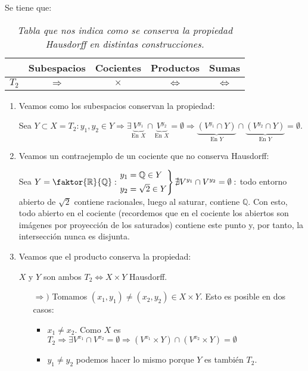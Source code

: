 Se tiene que:
\begin{table}[H]
\centering
\begin{tabular}{| c | c | c | c | c |}
    \hline
    & Subespacios & Cocientes & Productos & Sumas\\
    \hline
    $T_2$ & $\Rightarrow$ & $\times$ & $\Leftrightarrow$ & $\Leftrightarrow$\\
    \hline
\end{tabular}
\caption{\textit{Tabla que nos indica como se conserva la propiedad Hausdorff en distintas construcciones.}}
\end{table}
\begin{demo}
\begin{enumerate}
    \item\label{it:subespacio_hausdorff} Veamos como los subespacios conservan la propiedad: 

    Sea $Y \subset X = T_2: y_1, y_2 \in Y \Rightarrow \exists \underbrace{V^{y_1}}_{\text{En } X}  \cap \underbrace{V^{y_2}}_{\text{En } X} = \emptyset \Rightarrow \underbrace{\left( V^{y_1} \cap Y \right)}_{\text{En } Y}  \cap \underbrace{\left( V^{y_2} \cap Y \right)}_{\text{En } Y} = \emptyset$.

    \item Veamos un contraejemplo de un cociente que no conserva Hausdorff: 

    Sea $Y = \faktor{\mathbb{R}}{\mathbb{Q}}: \begin{rcases}
        y_1 = \mathbb{Q} \in Y\\
        y_2 = \sqrt{2} \in Y
    \end{rcases} \nexists V^{y_1} \cap V^{y_2} = \emptyset: $ todo entorno abierto de $\sqrt{2}$ contiene racionales, luego al saturar, contiene $\mathbb{Q}$. Con esto, todo abierto en el cociente (recordemos que en el cociente los abiertos son imágenes por proyección de los saturados) contiene este punto y, por tanto, la intersección nunca es disjunta.

    \item Veamos que el producto conserva la propiedad: 

    $X$ y $Y$ son ambos $T_2 \Leftrightarrow X \times Y$ Hausdorff.
    \begin{itemize}
        \item[$\Rightarrow)$] Tomamos $\left( x_1, y_1 \right) \neq \left( x_2, y_2 \right) \in X \times Y$. Esto es posible en dos casos:
        \begin{itemize}
            \item $x_1 \neq x_2$. Como $X$ es $T_2 \Rightarrow \exists V^{x_1} \cap V^{x_2} = \emptyset \Rightarrow \left( V^{x_1} \times Y \right) \cap \left( V^{x_2} \times Y \right) = \emptyset$ 
            \item $y_1 \neq y_2$ podemos hacer lo mismo porque $Y$ es también $T_2$.
        \end{itemize}


\end{itemize}
\end{enumerate}
\end{demo}
